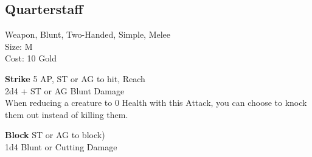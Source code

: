 \subsection{Quarterstaff}\label{weapon:quarterstaff}
Weapon, Blunt, Two-Handed, Simple, Melee\\
Size: M\\
Cost: 10 Gold

\textbf{Strike}
5 AP, ST or AG to hit,  Reach\\
2d4 + \texttimes ST or AG Blunt Damage\\
When reducing a creature to 0 Health with this Attack, you can choose to knock them out instead of killing them.

\textbf{Block}
ST or AG to block)\\
1d4 Blunt or Cutting Damage

